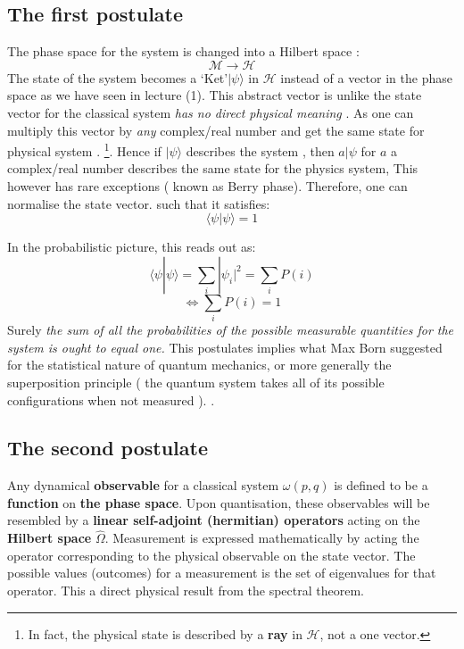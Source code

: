      \subsection{ The first postulate}
     The phase space for the system is changed  into a Hilbert space :
     \[
     \mathcal{M} \longrightarrow \mathcal{H}
     \]
     The state of the system becomes a `Ket'$ | \psi\rangle$ in $ \mathcal{H}$ instead of a vector in the phase space as we have seen in lecture (1). This abstract vector is unlike the state vector for the classical system \textit{has no direct physical meaning }. As one can multiply this vector by \textit{any} complex/real number and get the same state for physical system . \footnote{In fact, the physical state is described by a \textbf{ray} in $\mathcal{H}$, not a one vector. }. Hence if $ | \psi\rangle$ describes the system , then $ a | \psi$ for $a$ a complex/real number describes the same state for the physics system, This however has rare exceptions ( known as Berry phase). Therefore, one can normalise the state vector.  such that it satisfies:
     \begin{equation}
     \langle \psi | \psi\rangle =1 
     \end{equation}
     
     In the probabilistic picture, this reads out as:
     \[
     \langle \psi | \psi\rangle = \sum_i | \psi_i|^2 = \sum_i P(i) 
     \]
     \begin{equation}
     \Leftrightarrow \sum_i P(i) = 1 
     \end{equation}
     Surely \textit{the sum of all the probabilities of the possible measurable quantities for the system is ought to equal one.} 
     This postulates implies what Max Born suggested for the statistical nature of quantum mechanics, or more generally the superposition principle ( the quantum system takes all of its possible configurations when not  measured ). .
     \subsection{ The second postulate}
     Any dynamical \textbf{observable} for a classical system $ \omega ( p, q)$ is defined to be a \textbf{function} on \textbf{the phase space}. Upon quantisation, these observables will be resembled by a \textbf{linear self-adjoint (hermitian) operators} acting on the \textbf{Hilbert space} $ \hat{\Omega}$.
     Measurement is expressed mathematically by acting the operator corresponding to the physical observable on the state vector. The possible values (outcomes) for a measurement is the set of eigenvalues for that operator. This a direct physical result from the spectral theorem.
